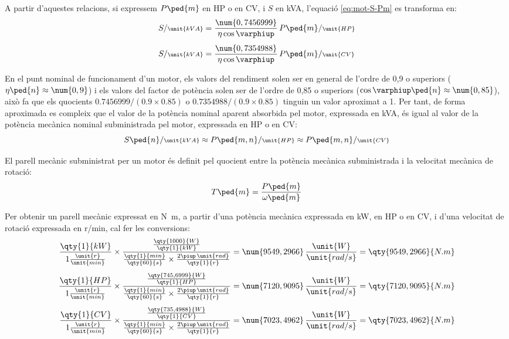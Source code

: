  A partir d'aquestes relacions, si expressem $P\ped{m}$  en HP o en CV, i $S$  en kVA, l'equació \eqref{eq:mot-S-Pm} es transforma en:
\begin{align}
    S/{\scriptstyle\unit{kVA}} &= \frac{\num{0,7456999}}{\eta \cos\varphiup}\,   P\ped{m}/{\scriptstyle\unit{HP}} \\[1ex]
    S/{\scriptstyle\unit{kVA}} &= \frac{\num{0,7354988}}{\eta \cos\varphiup}\,   P\ped{m}/{\scriptstyle\unit{CV}}
\end{align}

En el punt nominal de funcionament d'un motor, els valors del rendiment solen ser en general de l'ordre de 0,9 o superiors ($\eta\ped{n} \approx \num{0,9}$) i els valors del factor de potència solen ser de l'ordre de 0,85 o superiors ($\cos\varphiup\ped{n} \approx \num{0,85}$), això fa que els quocients $\num{0,7456999}/(\num{0,9} \times \num{0,85})$ o $\num{0,7354988}/(\num{0,9} \times \num{0,85})$ tinguin un valor aproximat a 1. Per tant, de forma aproximada es compleix que el valor de la potència nominal aparent absorbida pel motor, expressada en kVA, és igual al valor de la potència mecànica nominal subministrada pel motor, expressada en HP o en CV:
\begin{equation}\label{eq:kVA-CV-HP}
    S\ped{n}/{\scriptstyle \unit{kVA}} \approx  P\ped{m,n}/{\scriptstyle \unit{HP}} \approx  P\ped{m,n}/{\scriptstyle \unit{CV}}
\end{equation}


El parell mecànic subministrat per un motor és definit pel quocient entre la potència mecànica subministrada i la velocitat mecànica de rotació:
\begin{equation}\index{parell!mecànic}
    T\ped{m} = \frac{P\ped{m}}{\omega\ped{m}}\label{eq:T-P-w}
\end{equation}

Per  obtenir un  parell mecànic expressat en \unit{N.m}, a partir d'una potència mecànica expressada en kW, en HP o en CV, i d'una velocitat de rotació expressada en \unit{r/min}, cal  fer les conversions:
\begin{subequations}
\begin{align}
	\frac{\qty{1}{kW}}{1\frac{\unit{r}}{\unit{min}}} \times
    \frac{\frac{\qty{1000}{W}}{\qty{1}{kW}}}{ \frac{\qty{1}{min}}{\qty{60}{s}} \times \frac{2\piup\,\unit{rad}}{\qty{1}{r}}} &=  \num{9549,2966}\, \frac{\unit{W}}{\unit{rad/s}} = \qty{9549,2966}{N.m} \\[1ex]
    \frac{\qty{1}{HP}}{1\frac{\unit{r}}{\unit{min}}} \times
    \frac{\frac{\qty{745,6999}{W}}{\qty{1}{HP}}}{ \frac{\qty{1}{min}}{\qty{60}{s}} \times \frac{2\piup\,\unit{rad}}{\qty{1}{r}}} &=  \num{7120,9095}\, \frac{\unit{W}}{\unit{rad/s}} = \qty{7120,9095}{N.m} \\[1ex]
    \frac{\qty{1}{CV}}{1\frac{\unit{r}}{\unit{min}}} \times
    \frac{\frac{\qty{735,4988}{W}}{\qty{1}{CV}}}{ \frac{\qty{1}{min}}{\qty{60}{s}} \times \frac{2\piup\,\unit{rad}}{\qty{1}{r}}} &=  \num{7023,4962}\, \frac{\unit{W}}{\unit{rad/s}} = \qty{7023,4962}{N.m}
\end{align}
\end{subequations}

